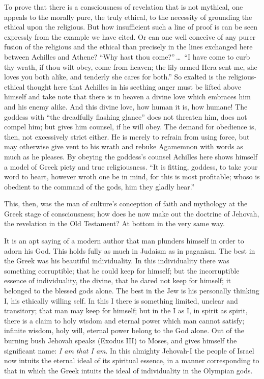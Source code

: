\documentclass[12pt]{book}
\newcommand{\opage}[1]{\marginnote{\footnotesize\textit{[#1]}}}
\begin{document}
To prove that there is a consciousness of revelation
\opage{95}\setcounter{footnote}{0}%
that is not mythical, one appeals to the morally pure, the truly
ethical, to the necessity of grounding the ethical upon the religious.
But how insufficient such a line of proof is can be seen expressly from
the example we have cited. Or can one well conceive of any purer fusion
of the religious and the ethical than precisely in the lines exchanged
here between Achilles and Athene? ``Why hast thou come?''\,\dots\ ``I have
come to curb thy wrath, if thou wilt obey, come from heaven; the
lily-armed Hera sent me, she loves you both alike, and tenderly she
cares for both.'' So exalted is the religious-ethical thought here that
Achilles in his seething anger must be lifted above himself and take
note that there is in heaven a divine love which embraces him and his
enemy alike. And this divine love, how human it is, how humane! The
goddess with ``the dreadfully flashing glance'' does not threaten him,
does not compel him; but gives him counsel, if he will obey. The demand
for obedience is, then, not excessively strict either. He is merely to
refrain from using force, but may otherwise give vent to his wrath and
rebuke Agamemnon with words as much as he pleases. By obeying the
goddess's counsel Achilles here shows himself a model of Greek piety and
true religiousness. ``It is fitting, goddess, to take your word to
heart, however wroth one be in mind, for this is most profitable; whoso
is obedient to the command of the gods, him they gladly hear.''

This, then, was the man of culture's conception of faith and mythology
at the Greek stage of consciousness; how does he now make out the
doctrine of Jehovah, the revelation in the Old Testament? At bottom in
the very same way.

It is an apt saying of a modern author
\opage{96}\setcounter{footnote}{0}%
that man plunders himself in order to adorn his God. This holds fully as
much in Judaism as in paganism. The best in the Greek was his beautiful
individuality. In this individuality there was something corruptible;
that he could keep for himself; but the incorruptible essence of
individuality, the divine, that he dared not keep for himself; it
belonged to the blessed gods alone. The best in the Jew is his
personally thinking I, his ethically willing self. In this I there is
something limited, unclear and transitory; that man may keep for
himself; but in the I as I, in spirit as spirit, there is a claim to
holy wisdom and eternal power which man cannot satisfy; infinite wisdom,
holy will, eternal power belong to the God alone. Out of the burning
bush Jehovah speaks (Exodus III) to Moses, and gives himself the
significant name: \emph{I am that I am}. In this almighty Jehovah-I the
people of Israel now intuits the eternal ideal of its spiritual essence,
in a manner corresponding to that in which the Greek intuits the ideal
of individuality in the Olympian gods.
\end{document}
